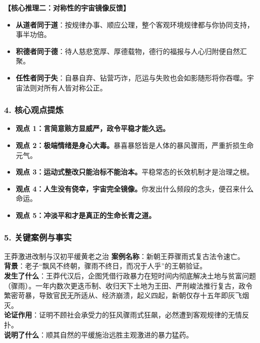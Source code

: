 \noindent\textbf{【核心推理二：对称性的宇宙镜像反馈】}
\begin{itemize}
    \item \textbf{从道者同于道}：按规律办事、顺应公理，整个客观环境规律都与你协同支持，事半功倍。
    \item \textbf{积德者同于德}：待人慈悲宽厚、厚德载物，德行的福报与人心归附便自然汇聚。
    \item \textbf{任性者同于失}：自暴自弃、钻营巧诈，厄运与失败也会如影随形将你吞噬。宇宙法则对所有人皆对称公正。
\end{itemize}

\subsubsection{4. 核心观点提炼}
\begin{itemize}
    \item \textbf{观点 1：言简意赅方显威严，政令平稳才能久远。}
    \item \textbf{观点 2：极端情绪是身心大毒。}暴喜暴怒皆是人体的暴风骤雨，严重折损生命元气。
    \item \textbf{观点 3：运动式整改只能治标不能治本。}平稳常态的长效机制才是治理之根。
    \item \textbf{观点 4：人生没有侥幸，宇宙完全镜像。}你发出什么频段的念头，便召来什么命运。
    \item \textbf{观点 5：冲淡平和才是真正的生命长青之道。}
\end{itemize}

\subsubsection{5. 关键案例与事实}
\begin{CaseBox}{王莽激进改制与汉初平缓黄老之治}
\textbf{案例名称}：新朝王莽骤雨式复古法令速亡。\\
\textbf{背景}：老子“飘风不终朝，骤雨不终日，而况于人乎”的王朝验证。\\
\textbf{发生了什么}：王莽代汉后，企图凭借行政暴力在短时间内彻底解决土地与贫富问题（骤雨）。一年内数次更迭币制、收归天下土地为王田、严刑峻法推行复古，政令繁密苛暴，导致官民无所适从、经济崩溃，起义四起，新朝仅存十五年即灰飞烟灭。\\
\textbf{论证作用}：证明不顾社会承受力的狂风骤雨式狂飙，必然遭到客观规律的无情反扑。\\
\textbf{说明了什么}：顺其自然的平缓施治远胜主观激进的暴力猛药。
\end{CaseBox}

